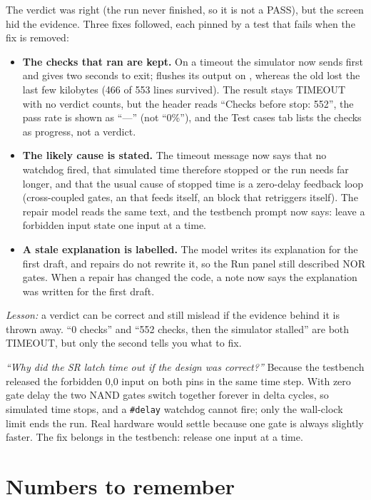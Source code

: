 The verdict was right (the run never finished, so it is not a PASS), but the screen hid the evidence. Three fixes followed, each pinned by a test that fails when the fix is removed:
\begin{itemize}
  \item \textbf{The checks that ran are kept.} On a timeout the simulator now sends  first and gives  two seconds to exit;  flushes its output on , whereas the old  lost the last few kilobytes (466 of 553 lines survived). The result stays TIMEOUT with no verdict counts, but the header reads ``Checks before stop: 552'', the pass rate is shown as ``---'' (not ``0\%''), and the Test cases tab lists the checks as progress, not a verdict.
  \item \textbf{The likely cause is stated.} The timeout message now says that no watchdog fired, that simulated time therefore stopped or the run needs far longer, and that the usual cause of stopped time is a zero-delay feedback loop (cross-coupled gates, an  that feeds itself, an  block that retriggers itself). The repair model reads the same text, and the testbench prompt now says: leave a forbidden input state one input at a time.
  \item \textbf{A stale explanation is labelled.} The model writes its explanation for the first draft, and repairs do not rewrite it, so the Run panel still described NOR gates. When a repair has changed the code, a note now says the explanation was written for the first draft.
\end{itemize}

\emph{Lesson:} a verdict can be correct and still mislead if the evidence behind it is thrown away. ``0 checks'' and ``552 checks, then the simulator stalled'' are both TIMEOUT, but only the second tells you what to fix.

\begin{viva}
\emph{``Why did the SR latch time out if the design was correct?''} Because the testbench released the forbidden 0,0 input on both pins in the same time step. With zero gate delay the two NAND gates switch together forever in delta cycles, so simulated time stops, and a \texttt{\#delay} watchdog cannot fire; only the wall-clock limit ends the run. Real hardware would settle because one gate is always slightly faster. The fix belongs in the testbench: release one input at a time.
\end{viva}

\section{Numbers to remember}

